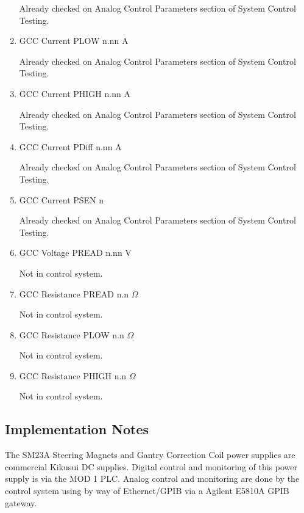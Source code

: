 \documentclass[11pt]{book}		%
\begin{document}
\begin{enumerate}
\color{red}
Already checked on Analog Control Parameters section of System Control Testing.
\color{black}

 \item GCC Current PLOW  n.nn A

\color{red}
Already checked on Analog Control Parameters section of System Control Testing.
\color{black}

 \item GCC Current PHIGH n.nn A

\color{red}
Already checked on Analog Control Parameters section of System Control Testing.
\color{black}

 \item GCC Current PDiff n.nn A

\color{red}
Already checked on Analog Control Parameters section of System Control Testing.
\color{black}

 \item GCC Current PSEN  n

\color{red}
Already checked on Analog Control Parameters section of System Control Testing.
\color{black}

 \item GCC Voltage PREAD n.nn V

\color{red}
Not in control system.
\color{black}

 \item GCC Resistance PREAD n.n $\Omega$

\color{red}
Not in control system.
\color{black}

 \item GCC Resistance PLOW n.n $\Omega$

\color{red}
Not in control system.
\color{black}

 \item GCC Resistance PHIGH n.n $\Omega$

\color{red}
Not in control system.
\color{black}

\end{enumerate}

\subsection{Implementation Notes}

The SM23A Steering Magnets and Gantry Correction Coil power supplies are commercial Kikusui DC supplies.  Digital control and monitoring of this power supply is via the MOD 1 PLC.  Analog control and monitoring are done by the control system using by way of Ethernet/GPIB via a Agilent E5810A GPIB gateway.
\end{document}
